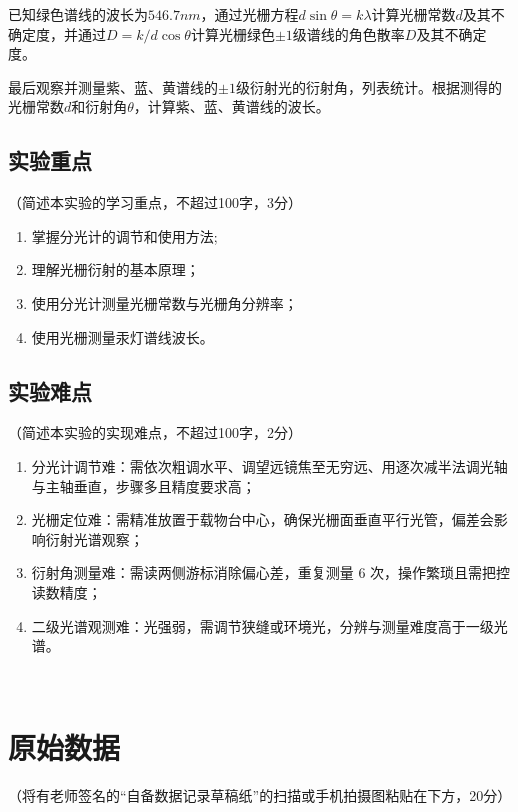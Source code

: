 \documentclass[10pt,a4paper]{ctexart}
\newcommand{\xiaosi}{\fontsize{12pt}{16pt}\selectfont}
\begin{document}
    已知绿色谱线的波长为$546.7nm$，通过光栅方程$d \sin \theta  = k \lambda $计算光栅常数$d$及其不确定度，并通过$D=k/d \cos\theta $计算光栅绿色$\pm 1$级谱线的角色散率$D$及其不确定度。

    最后观察并测量紫、蓝、黄谱线的$\pm 1$级衍射光的衍射角，列表统计。根据测得的光栅常数$d$和衍射角$\theta $，计算紫、蓝、黄谱线的波长。
   
    
    \subsection{实验重点}

    \xiaosi（简述本实验的学习重点，不超过100字，3分）


    \begin{enumerate}   
        \item 掌握分光计的调节和使用方法;
        \item 理解光栅衍射的基本原理；
        \item 使用分光计测量光栅常数与光栅角分辨率；
        \item 使用光栅测量汞灯谱线波长。

    \end{enumerate}  
    
    
    \subsection{实验难点}
    
    \xiaosi（简述本实验的实现难点，不超过100字，2分）

    \begin{enumerate}    
        \item 分光计调节难：需依次粗调水平、调望远镜焦至无穷远、用逐次减半法调光轴与主轴垂直，步骤多且精度要求高；
        \item 光栅定位难：需精准放置于载物台中心，确保光栅面垂直平行光管，偏差会影响衍射光谱观察；
        \item 衍射角测量难：需读两侧游标消除偏心差，重复测量 6 次，操作繁琐且需把控读数精度；
        \item 二级光谱观测难：光强弱，需调节狭缝或环境光，分辨与测量难度高于一级光谱。
    \end{enumerate}  \
\newpage

\section{原始数据}

    \xiaosi （将有老师签名的“自备数据记录草稿纸”的扫描或手机拍摄图粘贴在下方，20分）
\end{document}
